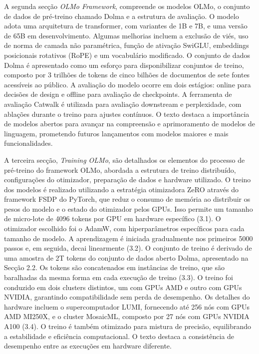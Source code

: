 \documentclass{article}
\begin{document}
\newpage
A segunda secção \textit{OLMo Framework}, compreende os modelos OLMo, o conjunto de dados de pré-treino chamado Dolma e a estrutura de avaliação. O modelo adota uma arquitetura de transformer, com variantes de 1B e 7B, e uma versão de 65B em desenvolvimento. Algumas melhorias incluem a exclusão de viés, uso de norma de camada não paramétrica, função de ativação SwiGLU, embeddings posicionais rotativos (RoPE) e um vocabulário modificado. O conjunto de dados Dolma é apresentado como um esforço para disponibilizar conjuntos de treino, composto por 3 trilhões de tokens de cinco bilhões de documentos de sete fontes acessíveis ao público. A avaliação do modelo ocorre em dois estágios: online para decisões de design e offline para avaliação de checkpoints. A ferramenta de avaliação Catwalk é utilizada para avaliação downstream e perplexidade, com ablações durante o treino para ajustes contínuos. O texto destaca a importância de modelos abertos para avançar na compreensão e aprimoramento de modelos de linguagem, prometendo futuros lançamentos com modelos maiores e mais funcionalidades.

\vspace{3mm}

A terceira secção, \textit{Training OLMo}, são detalhados os elementos do processo de pré-treino do framework OLMo, abordada a estrutura de treino distribuído, configurações do otimizador, preparação de dados e hardware utilizado.
O treino dos modelos é realizado utilizando a estratégia otimizadora ZeRO através do framework FSDP do PyTorch, que reduz o consumo de memória ao distribuir os pesos do modelo e o estado do otimizador pelos GPUs. Isso permite um tamanho de micro-lote de 4096 tokens por GPU em hardware específico (3.1).
O otimizador escolhido foi o AdamW, com hiperparâmetros específicos para cada tamanho de modelo. A aprendizagem é iniciada gradualmente nos primeiros 5000 passos e, em seguida, decai linearmente (3.2).
O conjunto de treino é derivado de uma amostra de 2T tokens do conjunto de dados aberto Dolma, apresentado na Secção 2.2. Os tokens são concatenados em instâncias de treino, que são baralhadas da mesma forma em cada execução de treino (3.3).
O treino foi conduzido em dois clusters distintos, um com GPUs AMD e outro com GPUs NVIDIA, garantindo compatibilidade sem perda de desempenho. Os detalhes do hardware incluem o supercomputador LUMI, fornecendo até 256 nós com GPUs AMD MI250X, e o cluster MosaicML, composto por 27 nós com GPUs NVIDIA A100 (3.4).
O treino é também otimizado para mistura de precisão, equilibrando a estabilidade e eficiência computacional. O texto destaca a consistência de desempenho entre as execuções em hardware diferente.
\end{document}

